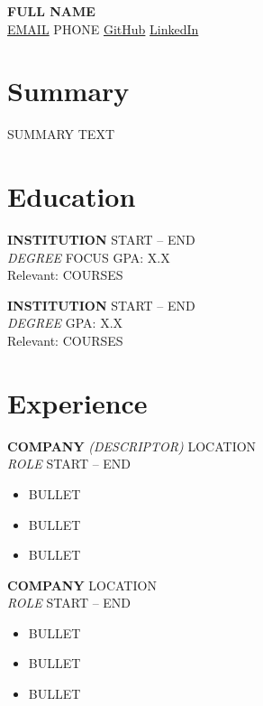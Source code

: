 \documentclass[11pt, letterpaper]{article}
\begin{document}
\begin{center}
  {\large\textbf{FULL NAME}} \\[4pt]
  \small
  \href{mailto:EMAIL}{EMAIL} \;\textbar\;
  PHONE \;\textbar\;
  \href{https://github.com/GITHUB}{GitHub} \;\textbar\;
  \href{https://linkedin.com/in/LINKEDIN}{LinkedIn}
\end{center}

\section{Summary}
\small
SUMMARY TEXT

\section{Education}

\small
\textbf{INSTITUTION} \hfill START -- END \\
\textit{DEGREE} \textbar{} FOCUS \hfill GPA: X.X \\
{\footnotesize Relevant: COURSES}

\vspace{3pt}
\textbf{INSTITUTION} \hfill START -- END \\
\textit{DEGREE} \hfill GPA: X.X \\
{\footnotesize Relevant: COURSES}

\section{Experience}

\small
\textbf{COMPANY} \textit{(DESCRIPTOR)} \hfill LOCATION \\
\textit{ROLE} \hfill START -- END
\begin{itemize}
  \item BULLET
  \item BULLET
  \item BULLET
\end{itemize}

\vspace{5pt}
\textbf{COMPANY} \hfill LOCATION \\
\textit{ROLE} \hfill START -- END
\begin{itemize}
  \item BULLET
  \item BULLET
  \item BULLET
\end{itemize}
\end{document}

